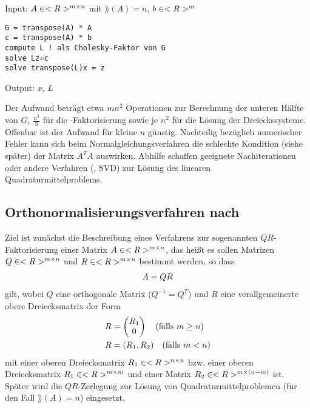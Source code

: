 \begin{algorithm}
	Input: $A\in<R>^{m\times n}$ mit $\rang(A)=n$, $b\in<R>^m$
	\begin{lstlisting}
G = transpose(A) * A
c = transpose(A) * b
compute L ! als Cholesky-Faktor von G
solve Lz=c
solve transpose(L)x = z
	\end{lstlisting}
	Output: $x$, $L$
\end{algorithm}

\begin{remark}
	Der Aufwand beträgt etwa $mn^2$ Operationen zur Berechnung der unteren Hälfte von $G$, $\frac{n^3}{3}$ für die -Faktorisierung sowie je $n^2$ für die Lösung der Dreieckssysteme. Offenbar ist der Aufwand für kleine $n$ günstig. Nachteilig bezüglich numerischer Fehler kann sich beim Normalgleichungsverfahren die schlechte Kondition (siehe später) der Matrix $A^TA$ auswirken. Abhilfe schaffen geeignete Nachiterationen oder andere Verfahren (, SVD) zur Lösung des linearen Quadraturmittelproblems.
\end{remark}

\subsection{Orthonormalisierungsverfahren nach }

Ziel ist zunächst die Beschreibung eines Verfahrens zur sogenannten $QR$-Faktorisierung einer Matrix $A\in<R>^{m\times n}$, das heißt es sollen Matrizen $Q\in<R>^{m\times n}$ und $R\in<R>^{m\times n}$ bestimmt werden, so dass
\begin{align}
	A = QR\notag
\end{align}
gilt, wobei $Q$ eine orthogonale Matrix ($Q^{-1}=Q^T$) und $R$ eine verallgemeinerte obere Dreiecksmatrix der Form
\begin{align}
	R &= \begin{pmatrix}
	R_1 \\ 0
	\end{pmatrix} \quad\text{(falls $m\ge n$)} \notag \\
	R &= (R_1,R_2) \quad\text{(falls $m < n$)} \notag
\end{align}
mit einer oberen Dreiecksmatrix $R_1\in<R>^{n\times n}$ bzw. einer oberen Dreiecksmatrix $R_1\in<R>^{m\times m}$ und einer Matrix $R_2\in<R>^{m\times (n-m)}$ ist. Später wird die $QR$-Zerlegung zur Lösung von Quadraturmittelproblemen (für den Fall $\rang(A)=n$) eingesetzt.

